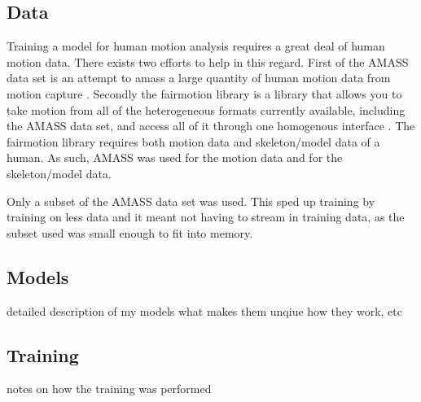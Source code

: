 \subsection{Data}\label{subsec:data}
Training a model for human motion analysis requires a great deal of human motion data. There exists two efforts to help in this regard. First of the AMASS data set is an attempt to amass a large quantity of human motion data from motion capture \cite{AMASS:2019}. Secondly the fairmotion library is a library that allows you to take motion from all of the heterogeneous formats currently available, including the AMASS data set, and access all of it through one homogenous interface \cite{gopinath2020fairmotion}. The fairmotion library requires both motion data and skeleton/model data of a human. As such, AMASS was used for the motion data and \cite{MANO:2017} for the skeleton/model data.

Only a subset of the AMASS data set was used. This sped up training by training on less data and it meant not having to stream in training data, as the subset used was small enough to fit into memory.

\subsection{Models}\label{subsec:models}
detailed description of my models what makes them unqiue how they work, etc
\subsection{Training}\label{subsec:training}
notes on how the training was performed